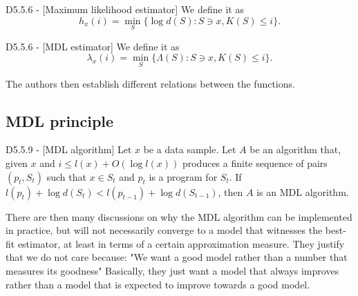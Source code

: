 \documentclass{article}
\begin{document}
\begin{flexidefinition}{D5.5.6 - }[Maximum likelihood estimator]
    We define it as
    \begin{equation}
        h_x(i) = \min_S \{\log d(S): S \ni x, K(S) \leq i \}.
    \end{equation}
\end{flexidefinition}

\begin{flexidefinition}{D5.5.6 - }[MDL estimator]
    We define it as
    \begin{equation}
        \lambda_x(i) = \min_S \{\Lambda(S): S \ni x, K(S) \leq i \}.
    \end{equation}
\end{flexidefinition}

The authors then establish different relations between the functions.

\subsection{MDL principle}

\begin{flexidefinition}{D5.5.9 - }[MDL algorithm]
    Let $x$ be a data sample. Let $A$ be an algorithm that, given $x$ and $i \leq l(x) + O(\log l(x))$ produces a finite sequence of pairs $(p_t,S_t)$ such that $x \in S_t$ and $p_t$ is a program for $S_t$. If $l(p_t) + \log d(S_t) < l(p_{t-1}) + \log d(S_{t-1})$, then $A$ is an MDL algorithm.
\end{flexidefinition}
There are then many discussions on why the MDL algorithm can be implemented in practice, but will not necessarily converge to a model that witnesses the best-fit estimator, at least in terms of a certain approximation measure. They justify that we do not care because: "We want a good model rather than a number that measures its goodness" Basically, they just want a model that always improves rather than a model that is expected to improve towards a good model.


{}

\end{document}

